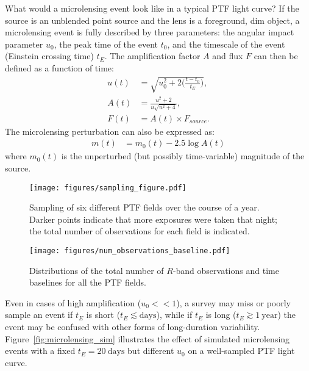 \documentclass{emulateapj}
\begin{document}
What would a microlensing event look like in a typical PTF light curve? If the source is an unblended point source and the lens is a foreground, dim object, a microlensing event is fully described by three parameters: the angular impact parameter $u_0$, the peak time of the event $t_0$, and the timescale of the event (Einstein crossing time) $t_E$. The amplification factor $A$ and flux $F$ can then be defined as a function of time: 
\begin{align}
	u(t) &= \sqrt{u_0^2 + 2\Big(\frac{t-t_0}{t_E}\Big)},\\
	A(t) &= \frac{u^2 + 2}{u\sqrt{u^2 + 4}},\\
	F(t) &= A(t)\times F_{source}.
\end{align}
The microlensing perturbation can also be expressed as:
\begin{align}
	m(t) &= m_0(t) - 2.5\log A(t)
\end{align}
where $m_0(t)$ is the unperturbed (but possibly time-variable) magnitude of the source.

\begin{figure}[!t]
\begin{center}
\texttt{[image: figures/sampling\_figure.pdf]}
\caption{Sampling of six different PTF fields over the course of a year. Darker points indicate that more exposures were taken that night; the total number of observations for each field is indicated.}\label{fig:sampling}
\end{center}
\end{figure}

\begin{figure}[h]
\centering\texttt{[image: figures/num\_observations\_baseline.pdf]}
\caption{Distributions of the total number of $R$-band observations and time baselines for all the PTF fields. \\}
\label{fig:num_obs}
\end{figure}

Even in cases of high amplification ($u_0<<1$), a survey may miss or poorly sample an event if $t_E$ is short ($t_E \lesssim\mathrm{days}$), while if $t_E$ is long ($t_E \gtrsim 1~\mathrm{year}$) the event may be confused with other forms of long-duration variability. Figure~\ref{fig:microlensing_sim} illustrates the effect of simulated microlensing events with a fixed $t_E=20~\mathrm{days}$ but different $u_0$ on a well-sampled PTF light curve. 
\end{document}

